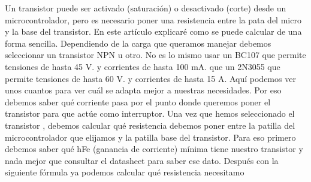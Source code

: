 \documentclass[11pt,a4paper]{article}
\begin{document}
Un transistor puede ser activado (saturación) o desactivado (corte) desde un microcontrolador, pero es necesario poner una resistencia entre la pata del micro y la base del transistor. En este artículo explicaré como se puede calcular de una forma sencilla.
Dependiendo de la carga que queramos manejar debemos seleccionar un transistor NPN u otro. No es lo mismo usar un BC107 que permite tensiones de hasta 45 V. y corrientes de hasta 100 mA. que un 2N3055 que permite tensiones de hasta 60 V. y corrientes de hasta 15 A. Aquí podemos ver unos cuantos para ver cuál se adapta mejor a nuestras necesidades. Por eso debemos saber qué corriente pasa por el punto donde queremos poner el transistor para que actúe como interruptor.
Una vez que hemos seleccionado el transistor , debemos calcular qué resistencia debemos poner entre la patilla del microcontrolador que elijamos y la patilla base del transistor. Para eso primero debemos saber qué hFe (ganancia de corriente) mínima tiene nuestro transistor y nada mejor que consultar el datasheet para saber ese dato.
Después con la siguiente fórmula ya podemos calcular qué resistencia necesitamo
\end{document}

